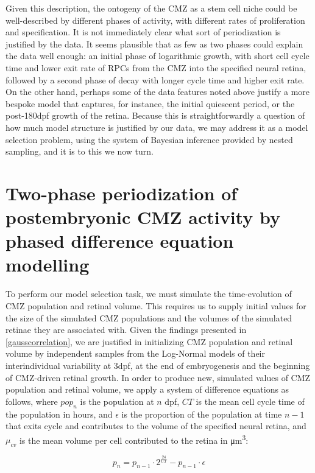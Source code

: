 Given this description, the ontogeny of the CMZ as a stem cell niche could be well-described by different phases of activity, with different rates of proliferation and specification. It is not immediately clear what sort of periodization is justified by the data. It seems plausible that as few as two phases could explain the data well enough: an initial phase of logarithmic growth, with short cell cycle time and lower exit rate of RPCs from the CMZ into the specified neural retina, followed by a second phase of decay with longer cycle time and higher exit rate. On the other hand, perhaps some of the data features noted above justify a more bespoke model that captures, for instance, the initial quiescent period, or the post-180dpf growth of the retina. Because this is straightforwardly a question of how much model structure is justified by our data, we may address it as a model selection problem, using the system of Bayesian inference provided by nested sampling, and it is to this we now turn.

\section{Two-phase periodization of postembryonic CMZ activity by phased difference equation modelling}
\label{sec:phaseGMC}
To perform our model selection task, we must simulate the time-evolution of CMZ population and retinal volume. This requires us to supply initial values for the size of the simulated CMZ populations and the volumes of the simulated retinae they are associated with. Given the findings presented in \autoref{gausscorrelation}, we are justified in initializing CMZ population and retinal volume by independent samples from the Log-Normal models of their interindividual variability at 3dpf, at the end of embryogenesis and the beginning of CMZ-driven retinal growth. In order to produce new, simulated values of CMZ population and retinal volume, we apply a system of difference equations as follows, where $pop_n$ is the population at $n$ dpf, $CT$ is the mean cell cycle time of the population in hours, and $\epsilon$ is the proportion of the population at time $n-1$ that exits cycle and contributes to the volume of the specified neural retina, and $\mu_{cv}$ is the mean volume per cell contributed to the retina in \si{\cubic\micro\metre}:

\begin{equation}
    p_n=p_{n-1} \cdot 2^{\frac{24}{CT}} - p_{n-1} \cdot \epsilon
    \label{popeq}
\end{equation}

